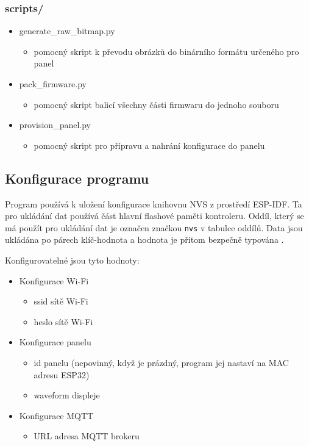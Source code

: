 \subsubsection*{scripts/}
\begin{itemize}
    \item generate\_raw\_bitmap.py
    \begin{itemize}
        \item pomocný skript k převodu obrázků do binárního formátu určeného pro panel
    \end{itemize}
    \item pack\_firmware.py
    \begin{itemize}
        \item pomocný skript balicí všechny části firmwaru do jednoho souboru
    \end{itemize}
    \item provision\_panel.py
    \begin{itemize}
        \item pomocný skript pro přípravu a nahrání konfigurace do panelu
    \end{itemize}
\end{itemize}

\subsection{Konfigurace programu}\label{konfigurace-panelu}
Program používá k uložení konfigurace knihovnu NVS z prostředí ESP-IDF. Ta pro ukládání dat používá část hlavní flashové paměti kontroleru. Oddíl, který se má použít pro ukládání dat je označen značkou \lstinline|nvs| v tabulce oddílů. Data jsou ukládána po párech klíč-hodnota a hodnota je přitom bezpečně typována \cite{NonVolatileStorageLibrary}.

Konfigurovatelné jsou tyto hodnoty:
\begin{itemize}
    \item Konfigurace Wi-Fi
    \begin{itemize}
        \item ssid sítě Wi-Fi
        \item heslo sítě Wi-Fi
    \end{itemize}
    \item Konfigurace panelu
    \begin{itemize}
        \item id panelu (nepovinný, když je prázdný, program jej nastaví na MAC adresu ESP32)
        \item waveform displeje
    \end{itemize}
    \item Konfigurace MQTT
    \begin{itemize}
        \item URL adresa MQTT brokeru
    \end{itemize}
\end{itemize}

